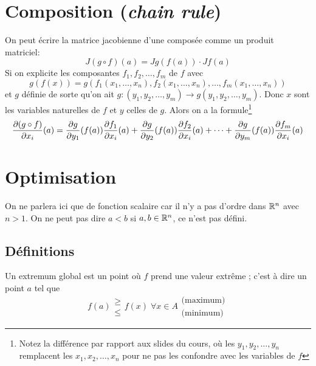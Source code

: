 
\section{Composition (\emph{chain rule})}

\begin{myform}
	On peut écrire la matrice jacobienne d'une composée comme un produit matriciel:
	\[ J(g \circ f)(a) = Jg(f(a)) \cdot Jf(a) \]
	Si on explicite les composantes $f_1, f_2, \dots , f_m$ de $f$ avec
	\[ g(f(x)) = g( f_1(x_1, \dots, x_n), f_2(x_1, \dots, x_n), \dots, f_m(x_1, \dots, x_n)) \]
	et $g$ définie de sorte qu'on ait $g : (y_1, y_2, \dots , y_m) \rightarrow g(y_1, y_2, \dots, y_m)$. Donc $x$ sont les variables naturelles de $f$ et $y$ celles de $g$.
	Alors on a la formule\footnote{Notez la différence par rapport aux slides du cours, où les $y_1, y_2, \dots, y_n$ remplacent les $x_1, x_2, \dots, x_n$ pour ne pas les confondre avec les variables de $f$}
	\[ \frac{\partial (g \circ f)}{\partial x_i}(a) = \frac{ \partial g}{\partial y_1}(f(a)) \frac{\partial f_1}{\partial x_i}(a) + \frac{ \partial g}{\partial y_2}(f(a)) \frac{\partial f_2}{\partial x_i}(a) + \cdots + \frac{ \partial g}{\partial y_m}(f(a)) \frac{\partial f_m}{\partial x_i}(a) \]
\end{myform}


\section{Optimisation}

On ne parlera ici que de fonction scalaire car il n'y a pas d'ordre dans $\mathbb{R}^n$ avec $n > 1$.
On ne peut pas dire $a < b$ si $a, b \in \mathbb{R}^n$, ce n'est pas défini.

\subsection{Définitions}

\begin{mydef} Un extremum global est un point où $f$ prend une valeur extrême ; c'est à dire un point $a$ tel que
	\[ f(a) \begin{array}{l} \geq \\ \leq \end{array} f(x) \; \forall x \in A \begin{array}{l} \text{(maximum)} \\ \text{(minimum)}
	\end{array} \]
\end{mydef}

